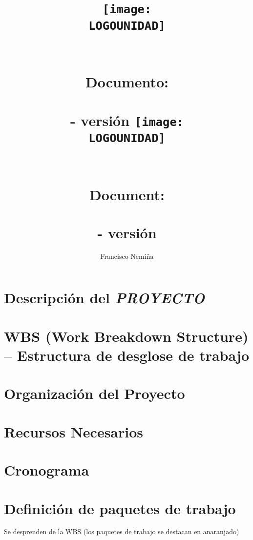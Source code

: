 \documentclass[12pt]{report}
\author[*]{Francisco Nemiña}
\affil[*]{Unidad de Formación Masiva}
\title{{\vspace{1cm}\texttt{[image: \\LOGOUNIDAD]}}\\ {\large \bf \SUBGERENCIA} \\ {\large \bf \GERENCIA}\\[2cm] {\large Documento:} \\ \PROYECTO \\ {\large \NOMBRE - versión \VERSION}}
\title{{\vspace{1cm}\texttt{[image: \\LOGOUNIDAD]}}\\ {\large \bf \SUBGERENCIA} \\ {\large \bf \GERENCIA}\\[2cm] {\large Document:} \\ \PROYECTO \\ {\large \NOMBRE - versión \VERSION}}
\date{\begin{flushleft} \vspace{5.6cm}ID: \texttt{\IDDOC} \end{flushleft}}
\begin{document}
\maketitle
\titlepage



\tableofcontents



\chapter{Descripción del \emph{PROYECTO}}


\chapter{WBS (Work Breakdown Structure) – Estructura de desglose de trabajo}


\chapter{Organización del Proyecto}


\chapter{Recursos Necesarios}


\chapter{Cronograma}


\chapter{Definición de paquetes de trabajo}
Se desprenden de la WBS (los paquetes de trabajo se destacan en anaranjado)




\nocite{*}
\printbibliography
\end{document}

